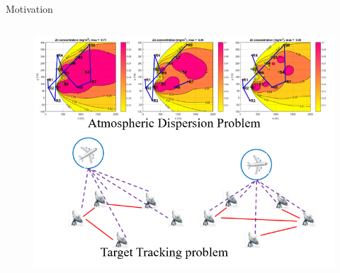 \documentclass{beamer}
\theoremstyle{remark}
\begin{document}
\begin{frame}{Motivation}
\begin{center}
\begin{columns}
		\begin{column}{.33\textwidth}
			\begin{figure}
				\centering
				\includegraphics[width=1\linewidth]{target_tracking}
			\end{figure}
		\end{column}
	\end{columns}
\vspace{-1.3cm}
%	


\end{center}
\end{frame}
\end{document}
